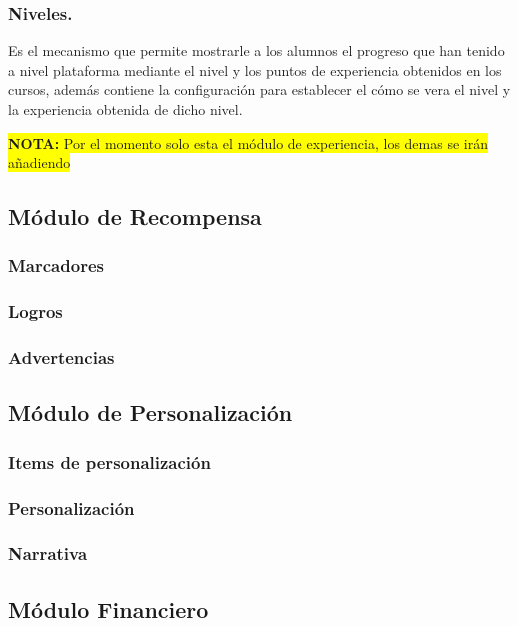 \subsubsection{Niveles.}

 Es el mecanismo que permite mostrarle a los alumnos el progreso que han tenido
 a nivel plataforma mediante el nivel y los puntos de experiencia obtenidos en
 los cursos, además contiene la configuración para establecer el cómo se vera el
 nivel y la experiencia obtenida de dicho nivel.


\par\bigskip\noindent\colorbox{yellow}{%
{\bf NOTA:} Por el momento solo esta el módulo de experiencia, los demas se irán añadiendo}
%
\subsection*{Módulo de Recompensa}

\subsubsection{Marcadores}
\subsubsection{Logros}
\subsubsection{Advertencias}

\subsection*{Módulo de Personalización}

\subsubsection{Items de personalización}
\subsubsection{Personalización}
\subsubsection{Narrativa}

\subsection*{Módulo Financiero}

